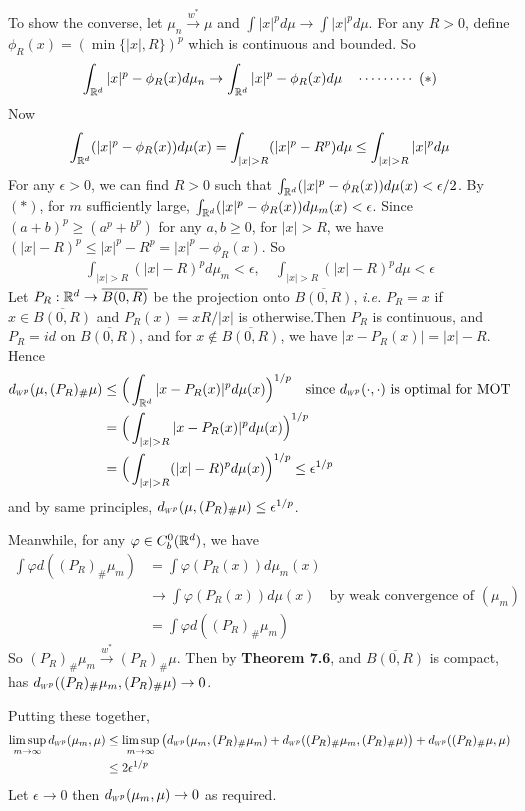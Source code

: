 \documentclass[12pt,a4paper]{article}
\newenvironment{proof}
{\begin{changemargin}{1cm}{0.5cm} 
	}%
	{\end{changemargin}
}
\newenvironment{p}
{\begin{proof} 
	}%
	{\end{proof}
}
\begin{document}
\begin{p}
To show the converse, let $\mu_n \xrightarrow{w^*} \mu$ and $\int |x|^p d\mu \rightarrow \int |x|^p d\mu$. For any $R>0$, define $\phi_R(x) = (\min \{|x|,R\})^p$ which is continuous and bounded. So
\begin{align*}
\int_{\mathbb{R}^d} |x|^p - \phi_R(x) d\mu_n \rightarrow \int_{\mathbb{R}^d}|x|^p - \phi_R(x) d\mu \quad \cdots\cdots\cdots\,\,(*)
\end{align*}
Now
\begin{align*}
\int_{\reals^d} (|x|^p - \phi_R(x)) d\mu(x) = \int_{|x|>R} (|x|^p -R^p) d\mu \leq \int_{|x|>R} |x|^p d\mu
\end{align*}
For any $\epsilon >0$, we can find $R>0$ such that $\int_{\mathbb{R}^d} (|x|^p -\phi_R(x)) d\mu(x) < \epsilon /2$. By $(*)$, for $m$ sufficiently large, $\int_{\mathbb{R}^d} (|x|^p - \phi_R(x)) d\mu_m(x) < \epsilon$. Since $(a+b)^p \geq (a^p + b^p)$ for any $a,b\geq 0$, for $|x|>R$, we have $(|x| - R)^p \leq |x|^p - R^p = |x|^p - \phi_R(x)$. So
\begin{align*}
\int_{|x|>R} (|x| - R)^p d\mu_m < \epsilon, \quad \int_{|x|>R} (|x| - R)^p d\mu < \epsilon 
\end{align*}
Let $P_R : \mathbb{R}^d \rightarrow \overline{B(0, R)}$ be the projection onto $\overline{B(0, R)}$, \textit{i.e.} $P_{R} =x$ if $x\in \overline{B(0, R)}$ and $P_R(x) = xR / |x|$ is otherwise.Then $P_R$ is continuous, and $P_R =id$ on $\overline{B(0, R)}$, and for $x\not\in \overline{B(0, R)}$, we have $|x- P_R(x)| = |x| - R$. Hence
\begin{align*}
\wa{p}(\mu, (P_R)_{\#}\mu) &\leq \Big( \int_{\reals^d} |x- P_R(x)|^p d\mu(x) \Big)^{1/p} \quad \text{since } \wa{p}(\cdot, \cdot) \text{ is optimal for MOT} \\
&= \Big( \int_{|x|>R} |x- P_R(x)|^p d\mu(x) \Big)^{1/p} \\
&= \Big( \int_{|x|>R} (|x|- R)^p d\mu(x) \Big)^{1/p} \leq \epsilon^{1/p} 
\end{align*}
and by same principles, $\wa{p}(\mu, (P_R)_{\#}\mu) \leq \epsilon^{1/p}$.

\quad Meanwhile, for any $\varphi \in C_b^0 (\mathbb{R}^d)$, we have
\begin{align*}
\int \varphi d( (P_R)_{\#} \mu_m) & = \int \varphi (P_R(x)) d\mu_m(x) \\
& \rightarrow \int \varphi(P_R(x)) d\mu(x) \quad \text{by weak convergence of } (\mu_m) \\
& =\int \varphi d( (P_R)_{\#} \mu_m)
\end{align*} 
So $(P_R)_{\#} \mu_m \xrightarrow{w^*} (P_R)_{\#} \mu$. Then by \textbf{Theorem 7.6}, and $\overline{B(0, R)}$ is compact, has $\wa{p}((P_R)_{\#}\mu_m, (P_R)_{\#}\mu) \rightarrow 0$.

\quad Putting these together,
\begin{align*}
\limsup_{m\rightarrow \infty} \wa{p}(\mu_m, \mu) & \leq \limsup_{m\rightarrow \infty} \big( \wa{p}(\mu_m, (P_R)_{\#}\mu_m) + \wa{p}((P_R)_{\#}\mu_m, (P_R)_{\#}\mu) \big) + \wa{p}((P_R)_{\#}\mu, \mu) \\
& \leq 2\epsilon^{1/p}
\end{align*}
Let $\epsilon \rightarrow 0$ then $\wa{p}(\mu_m, \mu) \rightarrow 0$ as required.

\eop
\end{p}
\end{document}
